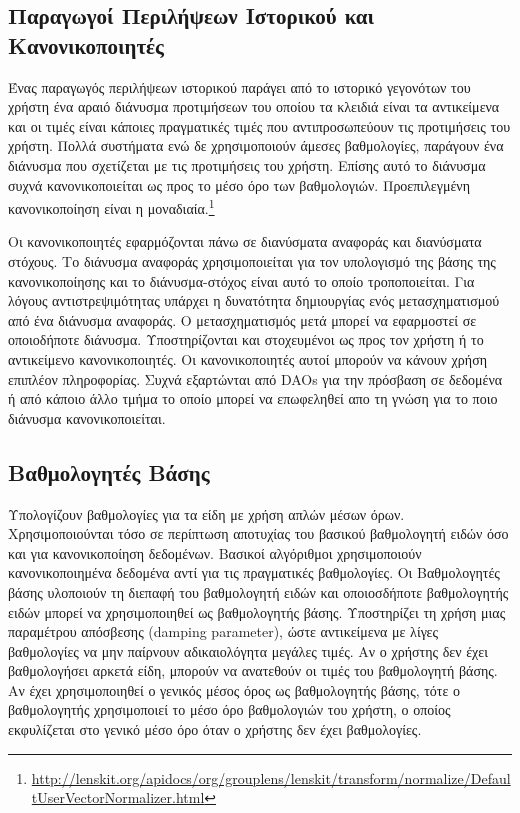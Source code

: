 \subsection{Παραγωγοί Περιλήψεων Ιστορικού και Κανονικοποιητές}
Ένας παραγωγός περιλήψεων ιστορικού παράγει από το ιστορικό γεγονότων του χρήστη ένα αραιό διάνυσμα προτιμήσεων του οποίου τα κλειδιά είναι τα αντικείμενα και οι τιμές είναι κάποιες πραγματικές τιμές που αντιπροσωπεύουν τις προτιμήσεις του χρήστη. Πολλά συστήματα ενώ δε χρησιμοποιούν άμεσες βαθμολογίες, παράγουν ένα διάνυσμα που σχετίζεται με τις προτιμήσεις του χρήστη. Επίσης αυτό το διάνυσμα συχνά κανονικοποιείται ως προς το μέσο όρο των βαθμολογιών. Προεπιλεγμένη κανονικοποίηση είναι η μοναδιαία.\footnote{\en \url{http://lenskit.org/apidocs/org/grouplens/lenskit/transform/normalize/DefaultUserVectorNormalizer.html}} \par
Οι κανονικοποιητές εφαρμόζονται πάνω σε διανύσματα αναφοράς και διανύσματα στόχους. Το διάνυσμα αναφοράς χρησιμοποιείται για τον υπολογισμό της βάσης της κανονικοποίησης και το διάνυσμα-στόχος είναι αυτό το οποίο τροποποιείται. Για λόγους αντιστρεψιμότητας υπάρχει η δυνατότητα δημιουργίας ενός μετασχηματισμού από ένα διάνυσμα αναφοράς. Ο μετασχηματισμός μετά μπορεί να εφαρμοστεί σε οποιοδήποτε διάνυσμα. Υποστηρίζονται και στοχευμένοι ως προς τον χρήστη ή το αντικείμενο κανονικοποιητές. Οι κανονικοποιητές αυτοί μπορούν να κάνουν χρήση επιπλέον πληροφορίας. Συχνά εξαρτώνται από \en DAOs \el για την πρόσβαση σε δεδομένα ή από κάποιο άλλο τμήμα το οποίο μπορεί να επωφεληθεί απο τη γνώση για το ποιο διάνυσμα κανονικοποιείται.
\subsection{Βαθμολογητές Βάσης}
Υπολογίζουν βαθμολογίες για τα είδη με χρήση απλών μέσων όρων. Χρησιμοποιού\-νται τόσο σε περίπτωση αποτυχίας του βασικού βαθμολογητή ειδών όσο και για κανονικοποίηση δεδομένων. Βασικοί αλγόριθμοι χρησιμοποιούν κανονικοποιημένα δεδομένα αντί για τις πραγματικές βαθμολογίες. Οι Βαθμολογητές βάσης υλοποιούν τη διεπαφή του βαθμολογητή ειδών και οποιοσδήποτε βαθμολογητής ειδών μπορεί να χρησιμοποιηθεί ως βαθμολογητής βάσης. Υποστηρίζει τη χρήση μιας παραμέτρου απόσβεσης (\en damping parameter)\el, ώστε αντικείμενα με λίγες βαθμολογίες να μην παίρνουν αδικαιολόγητα μεγάλες τιμές. Αν ο χρήστης δεν έχει βαθμολογήσει αρκετά είδη, μπορούν να ανατεθούν οι τιμές του βαθμολογητή βάσης. Αν έχει χρησιμοποιηθεί ο γενικός μέσος όρος ως βαθμολογητής βάσης, τότε ο βαθμολογητής χρησιμοποιεί το μέσο όρο βαθμολογιών του χρήστη, ο οποίος εκφυλίζεται στο γενικό μέσο όρο όταν ο χρήστης δεν έχει βαθμολογίες.
